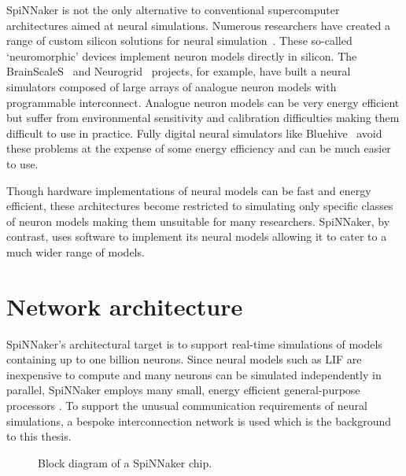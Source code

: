 		SpiNNaker is not the only alternative to conventional supercomputer
		architectures aimed at neural simulations. Numerous researchers have
		created a range of custom silicon solutions for neural
		simulation~\cite{misra10}. These so-called `neuromorphic' devices implement
		neuron models directly in silicon. The BrainScaleS~\cite{schemmel10} and
		Neurogrid~\cite{benjamin14} projects, for example, have built a neural
		simulators composed of large arrays of analogue neuron models with
		programmable interconnect. Analogue neuron models can be very energy
		efficient but suffer from environmental sensitivity and calibration
		difficulties making them difficult to use in practice. Fully digital neural
		simulators like Bluehive~\cite{moore12} avoid these problems at the expense
		of some energy efficiency and can be much easier to use.
		
		Though hardware implementations of neural models can be fast and energy
		efficient, these architectures become restricted to simulating only
		specific classes of neuron models making them unsuitable for many
		researchers. SpiNNaker, by contrast, uses software to implement its neural
		models allowing it to cater to a much wider range of models.
	
	\section{Network architecture}
		
		SpiNNaker's architectural target is to support real-time simulations of
		models containing up to one billion neurons. Since neural models such as
		LIF are inexpensive to compute and many neurons can be simulated
		independently in parallel, SpiNNaker employs many small, energy efficient
		general-purpose processors \cite{furber07}.  To support the unusual
		communication requirements of neural simulations, a bespoke interconnection
		network is used which is the background to this thesis.
		
		
		\begin{figure}
			\center
			
			\caption[SpiNNaker chips connected to their six neighbours.]%
			{SpiNNaker chips (actual size) connected to their six neighbours.}
			\label{fig:hex-chips}
			\vspace*{1.5cm}
			
			\center
			
			\caption{Block diagram of a SpiNNaker chip.}
			\label{fig:spinnaker-chip}
		\end{figure}
		
